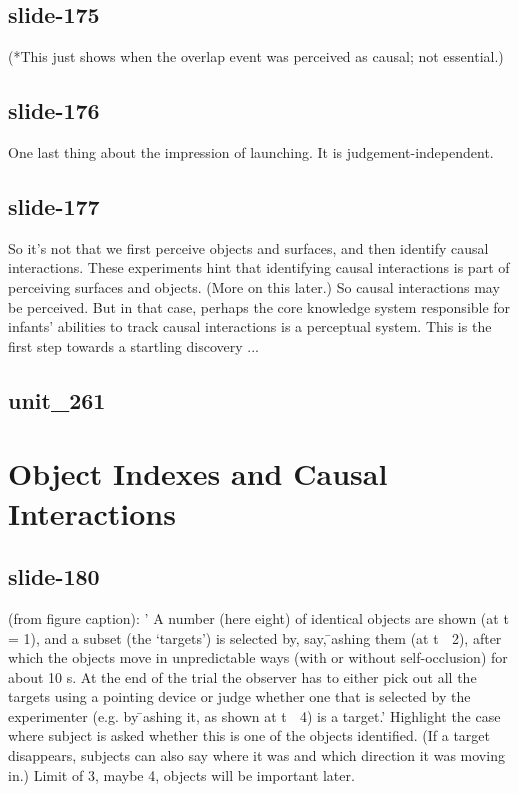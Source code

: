 \documentclass[12pt,\papersize]{extarticle}
\begin{document}
 
\subsection{slide-175}
(*This just shows when the overlap event was perceived as causal; not essential.)
 
 
\subsection{slide-176}
One last thing about the impression of launching. It is judgement-independent.
 
 
\subsection{slide-177}
So it's not that we first perceive objects and surfaces, and then identify causal interactions.
These experiments hint that identifying causal interactions is part of perceiving surfaces and objects. (More on this later.)
So causal interactions may be perceived.
But in that case, perhaps the core knowledge system responsible for infants' abilities to track causal interactions is a perceptual system.
This is the first step towards a startling discovery ...
 
 
\subsection{unit\_261}
 
\section{Object Indexes and Causal Interactions}
 
 
\subsection{slide-180}
(from figure caption): ' A number (here eight) of identical objects are shown (at t = 1), and a subset (the `targets') is selected by, say, ̄ashing them (at t 􏰈 2), after which the objects move in unpredictable ways (with or without self-occlusion) for about 10 s. At the end of the trial the observer has to either pick out all the targets using a pointing device or judge whether one that is selected by the experimenter (e.g. by ̄ashing it, as shown at t 􏰈 4) is a target.' \citep[p.\ 142]{Pylyshyn:2001hl}
Highlight the case where subject is asked whether this is one of the objects identified.
(If a target disappears, subjects can also say where it was and which direction it was moving in.)
Limit of 3, maybe 4, objects will be important later.
 
\end{document}
